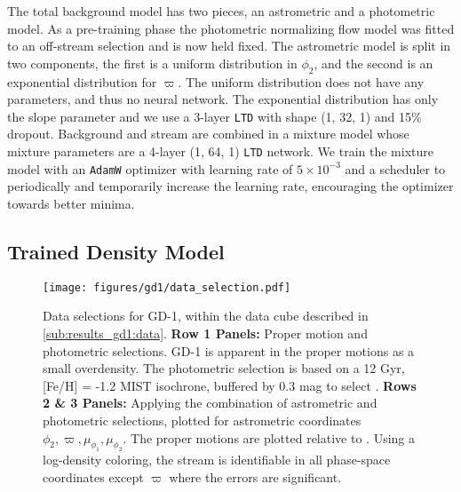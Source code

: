 \documentclass[twocolumn]{aastex631}
\newcommand{\stream}[1]{#1}
\newcommand{\parallax}{\varpi}
\begin{document}
        The total background model has two pieces, an astrometric and a
        photometric model.  As a pre-training phase the photometric normalizing
        flow model was fitted to an off-stream selection and is now held fixed.
        The astrometric model is split in two components, the first is a uniform
        distribution in $\phi_2$, and the second is an exponential distribution
        for $\parallax$.  The uniform distribution does not have any parameters,
        and thus no neural network.  The exponential distribution has only the
        slope parameter and we use a 3-layer \texttt{LTD} with shape (1, 32, 1)
        and 15\% dropout. Background and stream are combined in a mixture model
        whose mixture parameters are a 4-layer (1, 64, 1) \texttt{LTD} network.
        We train the mixture model with an \texttt{AdamW} optimizer with
        learning rate of $5\times10^{-3}$ and a scheduler to periodically and
        temporarily increase the learning rate, encouraging the optimizer
        towards better minima.

    \subsection{Trained Density Model} \label{sub:results_mock:results}

    \begin{figure*}[ht]
        \centering
        \texttt{[image: figures/gd1/data\_selection.pdf]}
        \caption{%
            Data selections for \stream{GD-1}, within the data cube described in
            \autoref{sub:results_gd1:data}.
            \textbf{Row 1 Panels:}
            Proper motion and photometric selections.  \stream{GD-1} is apparent
            in the proper motions as a small overdensity. The photometric
            selection is based on a 12 Gyr, [Fe/H] = -1.2 MIST isochrone,
            buffered by 0.3 mag to select .
            \textbf{Rows 2 \& 3 Panels:}
            Applying the combination of astrometric and photometric selections,
            plotted for astrometric coordinates $\phi_2, \parallax,
            \mu_{\phi_1}, \mu_{\phi_2}$.  The proper motions are plotted
            relative to . Using a log-density coloring,
            the stream is identifiable in all phase-space coordinates except
            $\parallax$ where the errors are significant.  }
        \label{fig:gd1-data_selection}
    \end{figure*}
\end{document}
